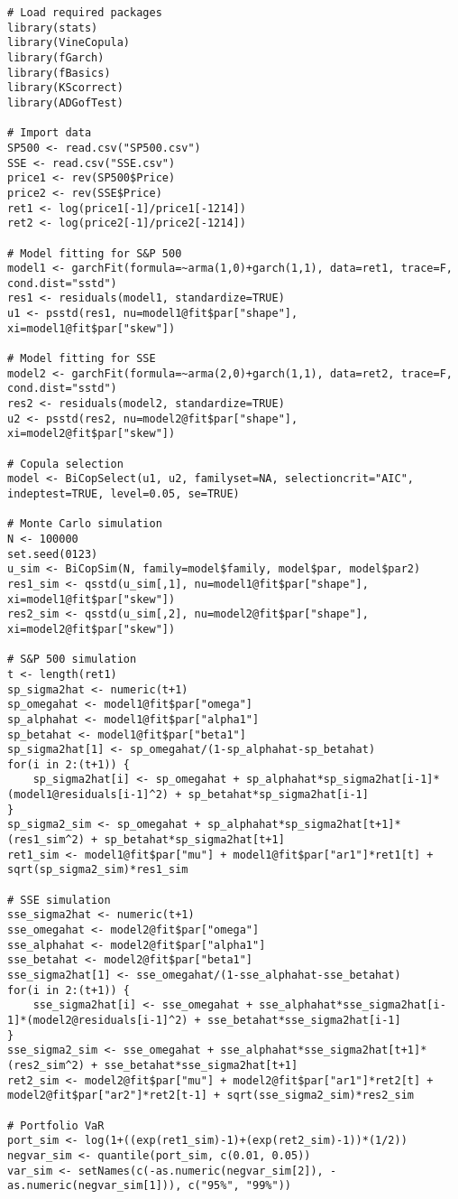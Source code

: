 \documentclass[a4paper,10pt]{article}
\begin{document}
\begin{lstlisting}
# Load required packages
library(stats)
library(VineCopula)
library(fGarch)
library(fBasics)
library(KScorrect)
library(ADGofTest)

# Import data
SP500 <- read.csv("SP500.csv")
SSE <- read.csv("SSE.csv")
price1 <- rev(SP500$Price)
price2 <- rev(SSE$Price)
ret1 <- log(price1[-1]/price1[-1214])
ret2 <- log(price2[-1]/price2[-1214])

# Model fitting for S&P 500
model1 <- garchFit(formula=~arma(1,0)+garch(1,1), data=ret1, trace=F, cond.dist="sstd")
res1 <- residuals(model1, standardize=TRUE)
u1 <- psstd(res1, nu=model1@fit$par["shape"], xi=model1@fit$par["skew"])

# Model fitting for SSE
model2 <- garchFit(formula=~arma(2,0)+garch(1,1), data=ret2, trace=F, cond.dist="sstd")
res2 <- residuals(model2, standardize=TRUE)
u2 <- psstd(res2, nu=model2@fit$par["shape"], xi=model2@fit$par["skew"])

# Copula selection
model <- BiCopSelect(u1, u2, familyset=NA, selectioncrit="AIC", indeptest=TRUE, level=0.05, se=TRUE)

# Monte Carlo simulation
N <- 100000
set.seed(0123)
u_sim <- BiCopSim(N, family=model$family, model$par, model$par2)
res1_sim <- qsstd(u_sim[,1], nu=model1@fit$par["shape"], xi=model1@fit$par["skew"])
res2_sim <- qsstd(u_sim[,2], nu=model2@fit$par["shape"], xi=model2@fit$par["skew"])

# S&P 500 simulation
t <- length(ret1)
sp_sigma2hat <- numeric(t+1)
sp_omegahat <- model1@fit$par["omega"]
sp_alphahat <- model1@fit$par["alpha1"]
sp_betahat <- model1@fit$par["beta1"]
sp_sigma2hat[1] <- sp_omegahat/(1-sp_alphahat-sp_betahat)
for(i in 2:(t+1)) {
    sp_sigma2hat[i] <- sp_omegahat + sp_alphahat*sp_sigma2hat[i-1]*(model1@residuals[i-1]^2) + sp_betahat*sp_sigma2hat[i-1]
}
sp_sigma2_sim <- sp_omegahat + sp_alphahat*sp_sigma2hat[t+1]*(res1_sim^2) + sp_betahat*sp_sigma2hat[t+1]
ret1_sim <- model1@fit$par["mu"] + model1@fit$par["ar1"]*ret1[t] + sqrt(sp_sigma2_sim)*res1_sim

# SSE simulation
sse_sigma2hat <- numeric(t+1)
sse_omegahat <- model2@fit$par["omega"]
sse_alphahat <- model2@fit$par["alpha1"]
sse_betahat <- model2@fit$par["beta1"]
sse_sigma2hat[1] <- sse_omegahat/(1-sse_alphahat-sse_betahat)
for(i in 2:(t+1)) {
    sse_sigma2hat[i] <- sse_omegahat + sse_alphahat*sse_sigma2hat[i-1]*(model2@residuals[i-1]^2) + sse_betahat*sse_sigma2hat[i-1]
}
sse_sigma2_sim <- sse_omegahat + sse_alphahat*sse_sigma2hat[t+1]*(res2_sim^2) + sse_betahat*sse_sigma2hat[t+1]
ret2_sim <- model2@fit$par["mu"] + model2@fit$par["ar1"]*ret2[t] + model2@fit$par["ar2"]*ret2[t-1] + sqrt(sse_sigma2_sim)*res2_sim

# Portfolio VaR
port_sim <- log(1+((exp(ret1_sim)-1)+(exp(ret2_sim)-1))*(1/2))
negvar_sim <- quantile(port_sim, c(0.01, 0.05))
var_sim <- setNames(c(-as.numeric(negvar_sim[2]), -as.numeric(negvar_sim[1])), c("95%", "99%"))
\end{lstlisting}
\end{document}

